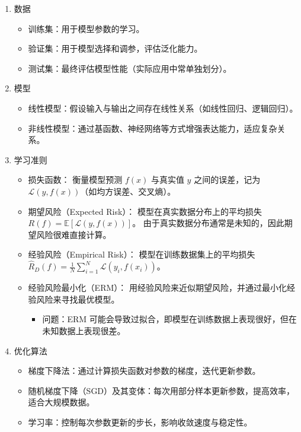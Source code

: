 \documentclass{article}
\theoremstyle{remark}
\theoremstyle{definition}
\theoremstyle{plain}
\numberwithin {equation}{section}
\numberwithin{assumption}{section}
\begin{document}
\begin{enumerate}
  \item 数据
    \begin{itemize}
      \item 训练集：用于模型参数的学习。
      \item 验证集：用于模型选择和调参，评估泛化能力。
      \item 测试集：最终评估模型性能（实际应用中常单独划分）。
    \end{itemize}
  \item 模型
    \begin{itemize}
      \item 线性模型：假设输入与输出之间存在线性关系（如线性回归、逻辑回归）。
      \item 非线性模型：通过基函数、神经网络等方式增强表达能力，适应复杂关系。
    \end{itemize}
  \item 学习准则
    \begin{itemize}
      \item 损失函数：
        衡量模型预测 $f(x)$ 与真实值 $y$ 之间的误差，记为 $\mathcal{L}(y, f(x))$（如均方误差、交叉熵）。
      \item 期望风险（Expected Risk）：
        模型在真实数据分布上的平均损失 $R(f) = \mathbb{E}[\mathcal{L}(y, f(x))]$。
        由于真实数据分布通常是未知的，因此期望风险很难直接计算。
      \item 经验风险（Empirical Risk）：
        模型在训练数据集上的平均损失 $\hat{R}_D(f) = \frac{1}{N} \sum_{i=1}^N \mathcal{L}(y_i, f(x_i))$。
      \item 经验风险最小化（ERM）：
        用经验风险来近似期望风险，并通过最小化经验风险来寻找最优模型。
        \begin{itemize}
            \item 问题：ERM 可能会导致过拟合，即模型在训练数据上表现很好，但在未知数据上表现很差。
        \end{itemize}
    \end{itemize}
  \item 优化算法
    \begin{itemize}
      \item 梯度下降法：通过计算损失函数对参数的梯度，迭代更新参数。
      \item 随机梯度下降（SGD）及其变体：每次用部分样本更新参数，提高效率，适合大规模数据。
      \item 学习率：控制每次参数更新的步长，影响收敛速度与稳定性。
    \end{itemize}
\end{enumerate}
\end{document}
